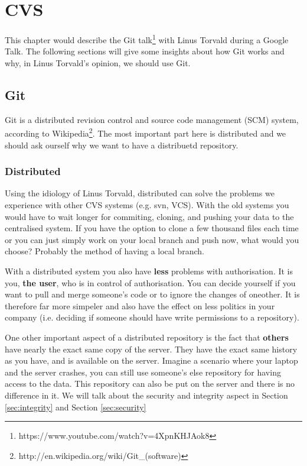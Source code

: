 \chapter{CVS}
\label{chap:cvs}
This chapter would describe the Git talk\footnote{https://www.youtube.com/watch?v=4XpnKHJAok8} with Linus Torvald during a Google Talk. The following sections will give some insights about how Git works and why, in Linus Torvald's opinion, we should use Git.

\section{Git}
\label{sec:git}
Git is a distributed revision control and source code management (SCM) system, according to Wikipedia\footnote{http://en.wikipedia.org/wiki/Git\_(software)}. The most important part here is distributed and we should ask ourself why we want to have a distribuetd repository.

\subsection{Distributed}
\label{sec:git-distributed}
Using the idiology of Linus Torvald, distributed can solve the problems we experience with other CVS systems (e.g. svn, VCS). With the old systems you would have to wait longer for commiting, cloning, and pushing your data to the centralised system. If you have the option to clone a few thousand files each time or you can just simply work on your local branch and  push now, what would you choose? Probably the method of having a local branch.

With a distributed system you also have \textbf{less} problems with authorisation. It is you, \textbf{the user}, who is in control of authorisation. You can decide yourself if you want to pull and merge someone's code or to ignore the changes of oneother. It is therefore far more simpeler and also have the effect on less politics in your company (i.e. deciding if someone should have write permissions to a repository).

One other important aspect of a distributed repository is the fact that \textbf{others} have nearly the exact same copy of the server. They have the exact same history as you have, and is available on the server. Imagine a scenario where your laptop and the server crashes, you can still use someone's else repository for having access to the data. This repository can also be put on the server and there is no difference in it. We will talk about the security and integrity aspect in Section \ref{sec:integrity} and Section \ref{sec:security}

